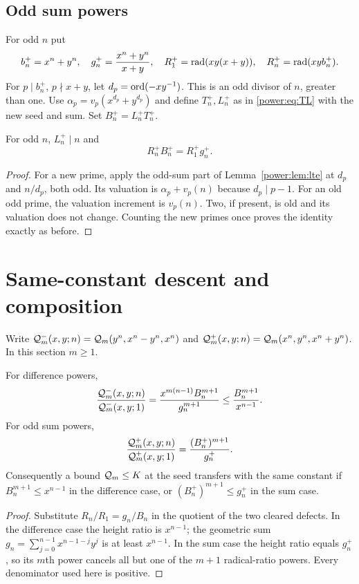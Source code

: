 \subsection{Odd sum powers}
For odd $n$ put
\[
b_n^+=x^n+y^n,\quad g_n^+=\frac{x^n+y^n}{x+y},\quad
R_1^+=\operatorname{rad}(xy(x+y)),\quad R_n^+=\operatorname{rad}(xyb_n^+).
\]
For $p\mid b_n^+$, $p\nmid x+y$, let
$d_p=\operatorname{ord}(-xy^{-1})$. This is an odd divisor of $n$, greater than one.
Use $\alpha_p=v_p(x^{d_p}+y^{d_p})$ and define $T_n^+,L_n^+$ as in
\eqref{power:eq:TL} with the new seed and sum. Set $B_n^+=L_n^+T_n^+$.

\begin{proposition}\label{power:prop:sum}
For odd $n$, $L_n^+\mid n$ and
\begin{equation}\label{power:eq:sumbalance}
R_n^+B_n^+=R_1^+g_n^+.
\end{equation}
\end{proposition}
\begin{proof}
For a new prime, apply the odd-sum part of Lemma~\ref{power:lem:lte} at $d_p$ and
$n/d_p$, both odd. Its valuation is $\alpha_p+v_p(n)$ because $d_p\mid p-1$.
For an old odd prime, the valuation increment is $v_p(n)$. Two, if present,
is old and its valuation does not change. Counting the new primes once
proves the identity exactly as before.
\end{proof}

\section{Same-constant descent and composition}
Write $\mathcal Q_m^-(x,y;n)=\mathcal Q_m(y^n,x^n-y^n,x^n)$ and
$\mathcal Q_m^+(x,y;n)=\mathcal Q_m(x^n,y^n,x^n+y^n)$. In this section $m\ge1$.

\begin{theorem}\label{power:thm:transfer}
For difference powers,
\begin{equation}\label{power:eq:minusdefect}
\frac{\mathcal Q_m^-(x,y;n)}{\mathcal Q_m^-(x,y;1)}
=\frac{x^{m(n-1)}B_n^{m+1}}{g_n^{m+1}}
\le\frac{B_n^{m+1}}{x^{n-1}}.
\end{equation}
For odd sum powers,
\begin{equation}\label{power:eq:plusdefect}
\frac{\mathcal Q_m^+(x,y;n)}{\mathcal Q_m^+(x,y;1)}
=\frac{(B_n^+)^{m+1}}{g_n^+}.
\end{equation}
Consequently a bound $\mathcal Q_m\le K$ at the seed transfers with the same constant
if $B_n^{m+1}\le x^{n-1}$ in the difference case, or
$(B_n^+)^{m+1}\le g_n^+$ in the sum case.
\end{theorem}
\begin{proof}
Substitute $R_n/R_1=g_n/B_n$ in the quotient of the two cleared defects.
In the difference case the height ratio is $x^{n-1}$; the geometric sum
$g_n=\sum_{j=0}^{n-1}x^{n-1-j}y^j$ is at least $x^{n-1}$. In the sum case
the height ratio equals $g_n^+$, so its $m$th power cancels all but one of
the $m+1$ radical-ratio powers. Every denominator used here is positive.
\end{proof}

